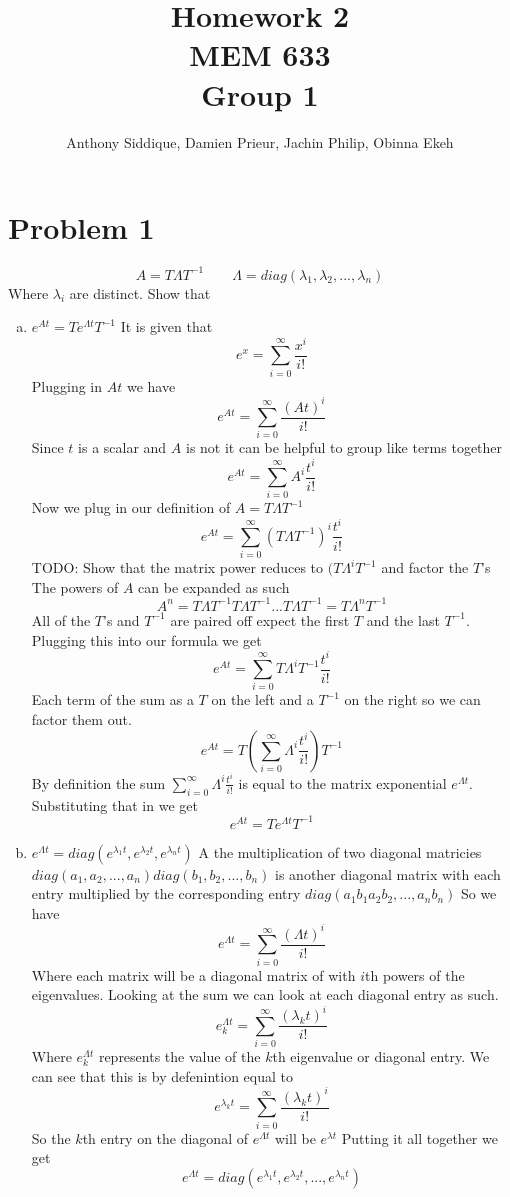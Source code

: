 \documentclass{article}
\author{Anthony Siddique, Damien Prieur, Jachin Philip, Obinna Ekeh}
\title{Homework 2\\ MEM 633 \\ Group 1}
\date{}
\begin{document}
\maketitle

\section*{Problem 1}
$$ A = T \Lambda T^{-1} \qquad \Lambda = diag(\lambda_1,\lambda_2, ..., \lambda_n) $$
Where $\lambda_i$ are distinct.
Show that
\begin{enumerate}[(a)]
\item $e^{At} = Te^{\Lambda t}T^{-1}$
\newline
It is given that
$$ e^x = \sum_{i=0}^\infty \frac{x^i}{i!} $$
Plugging in $At$ we have
$$ e^{At} = \sum_{i=0}^\infty \frac{(At)^i}{i!} $$
Since $t$ is a scalar and $A$ is not it can be helpful to group like terms together
$$ e^{At} = \sum_{i=0}^\infty A^i\frac{t^i}{i!} $$
Now we plug in our definition of $A = T \Lambda T^{-1} $
$$ e^{At} = \sum_{i=0}^\infty (T \Lambda T^{-1})^i\frac{t^i}{i!} $$
TODO: Show that the matrix power reduces to $(T \Lambda^i T^{-1}$ and factor the $T$'s
The powers of $A$ can be expanded as such
$$ A^n = T\Lambda T^{-1} T\Lambda T^{-1}...T\Lambda T^{-1} = T\Lambda^n T^{-1} $$
All of the $T$'s and $T^{-1}$ are paired off expect the first $T$ and the last $T^{-1}$.
Plugging this into our formula we get
$$ e^{At} = \sum_{i=0}^\infty T \Lambda^i T^{-1}\frac{t^i}{i!} $$
Each term of the sum as a $T$ on the left and a $T^{-1}$ on the right so we can factor them out.
$$ e^{At} = T(\sum_{i=0}^\infty \Lambda^i \frac{t^i}{i!})T^{-1} $$
By definition the sum $\sum_{i=0}^\infty \Lambda^i \frac{t^i}{i!}$ is equal to the matrix exponential $e^{\Lambda t}$.
Substituting that in we get
$$ e^{At} = Te^{\Lambda t}T^{-1} $$



\item $e^{\Lambda t} = diag (e^{\lambda_1 t}, e^{\lambda_2 t}, e^{\lambda_n t})$
\newline
A the multiplication of two diagonal matricies  $diag(a_1, a_2, ..., a_n) diag(b_1, b_2, ..., b_n)$ is another diagonal matrix with each entry multiplied by the corresponding entry $ diag(a_1b_1 a_2b_2, ..., a_nb_n)$
So we have
$$ e^{\Lambda t} = \sum_{i=0}^\infty \frac{(\Lambda t) ^i}{i!} $$
Where each matrix will be a diagonal matrix of with $i$th powers of the eigenvalues.
Looking at the sum we can look at each diagonal entry as such.
$$ e^{\Lambda t}_k = \sum_{i=0}^\infty \frac{(\lambda_k t) ^i}{i!} $$
Where $e^{\Lambda t}_k$ represents the value of the $k$th eigenvalue or diagonal entry.
We can see that this is by defenintion equal to
$$ e^{\lambda_k t} = \sum_{i=0}^\infty \frac{(\lambda_k t) ^i}{i!} $$
So the $k$th entry on the diagonal of $e^{\Lambda t}$ will be $e^{\lambda t}$
Putting it all together we get
$$ e^{\Lambda t} = diag(e^{\lambda_1 t}, e^{\lambda_2 t}, ... , e^{\lambda_n t})$$

\end{enumerate}
\end{document}
